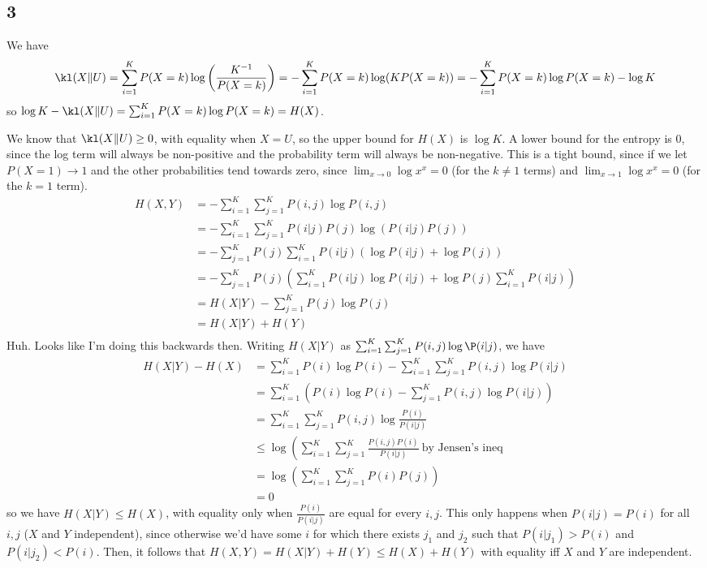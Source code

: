 \documentclass{article}
\begin{document}
\subsection*{3}
We have 
\[\kl(X\|U)=\sum_{i=1}^KP(X=k)\log\left(\frac{K^{-1}}{P(X=k)}\right)=-\sum_{i=1}^KP(X=k)\log(KP(X=k))=-\sum_{i=1}^KP(X=k)\log P(X=k)-\log K\]
so $\log K-\kl(X\|U)=\sum_{i=1}^KP(X=k)\log P(X=k)=H(X)$.

We know that $\kl(X\|U)\geq0$, with equality when $X=U$, so the upper bound for $H(X)$ is $\log K$. A lower bound for the entropy is $0$, since the log term will always be non-positive and the probability term will always be non-negative. This is a tight bound, since if we let $P(X=1)\to1$ and the other probabilities tend towards zero, since $\lim_{x\to0}\log x^x=0$ (for the $k\neq1$ terms) and $\lim_{x\to1}\log x^x=0$ (for the $k=1$ term).
\begin{align*}
    H(X,Y)&=-\sum_{i=1}^K\sum_{j=1}^KP(i,j)\log P(i,j)\\
          &=-\sum_{i=1}^K\sum_{j=1}^KP(i|j)P(j)\log \left(P(i|j)P(j)\right)\\
          &=-\sum_{j=1}^KP(j)\sum_{i=1}^KP(i|j)\left(\log P(i|j) + \log P(j)\right)\\
          &=-\sum_{j=1}^KP(j)\left(\sum_{i=1}^KP(i|j)\log P(i|j)+\log P(j)\sum_{i=1}^KP(i|j)\right)\\
          &=H(X|Y)-\sum_{j=1}^KP(j)\log P(j)\\
          &=H(X|Y)+H(Y)\\
\end{align*}
Huh. Looks like I'm doing this backwards then. Writing $H(X|Y)$ as $\sum_{i=1}^K\sum_{j=1}^KP(i,j)\log \P(i|j)$, we have 
\begin{align*}
    H(X|Y)-H(X)&=\sum_{i=1}^KP(i)\log P(i)-\sum_{i=1}^K\sum_{j=1}^KP(i,j)\log P(i|j)\\
               &=\sum_{i=1}^K \left(P(i)\log P(i)-\sum_{j=1}^KP(i,j)\log P(i|j)\right)\\
               &=\sum_{i=1}^K\sum_{j=1}^KP(i,j)\log\frac{P(i)}{P(i|j)}\\
               &\leq\log\left(\sum_{i=1}^K\sum_{j=1}^K\frac{P(i,j)P(i)}{P(i|j)}\ \text{by Jensen's ineq}\\
               &=\log\left(\sum_{i=1}^K\sum_{j=1}^KP(i)P(j)\right)\\
               &=0
\end{align*}
so we have $H(X|Y)\leq H(X)$, with equality only when $\frac{P(i)}{P(i|j)}$ are equal for every $i,j$. This only happens when $P(i|j)=P(i)$ for all $i,j$ ($X$ and $Y$ independent), since otherwise we'd have some $i$ for which there exists $j_1$ and $j_2$ such that $P(i|j_1)>P(i)$ and $P(i|j_2)<P(i)$. Then, it follows that $H(X,Y)=H(X|Y)+H(Y)\leq H(X)+H(Y)$ with equality iff $X$ and $Y$ are independent.
\end{document}

